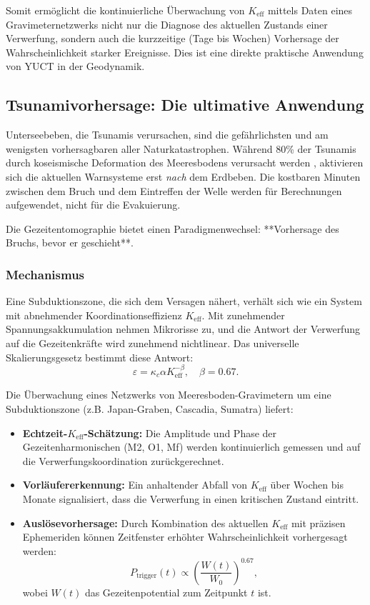 \documentclass[12pt,a4paper]{article}
\theoremstyle{remark}
\begin{document}
	Somit ermöglicht die kontinuierliche Überwachung von \(K_{\mathrm{eff}}\) mittels Daten eines Gravimeternetzwerks nicht nur die Diagnose des aktuellen Zustands einer Verwerfung, sondern auch die kurzzeitige (Tage bis Wochen) Vorhersage der Wahrscheinlichkeit starker Ereignisse. Dies ist eine direkte praktische Anwendung von YUCT in der Geodynamik.
	
	\subsection{Tsunamivorhersage: Die ultimative Anwendung}
	\label{sec:tsunami}
	
	Unterseebeben, die Tsunamis verursachen, sind die gefährlichsten und am wenigsten vorhersagbaren aller Naturkatastrophen. Während 80\% der Tsunamis durch koseismische Deformation des Meeresbodens verursacht werden \cite{NOAA2024, USGS2024}, aktivieren sich die aktuellen Warnsysteme erst \textit{nach} dem Erdbeben. Die kostbaren Minuten zwischen dem Bruch und dem Eintreffen der Welle werden für Berechnungen aufgewendet, nicht für die Evakuierung.
	
	Die Gezeitentomographie bietet einen Paradigmenwechsel: **Vorhersage des Bruchs, bevor er geschieht**.
	
	\subsubsection{Mechanismus}
	
	Eine Subduktionszone, die sich dem Versagen nähert, verhält sich wie ein System mit abnehmender Koordinationseffizienz \(K_{\mathrm{eff}}\). Mit zunehmender Spannungsakkumulation nehmen Mikrorisse zu, und die Antwort der Verwerfung auf die Gezeitenkräfte wird zunehmend nichtlinear. Das universelle Skalierungsgesetz bestimmt diese Antwort:
	\[
	\varepsilon = \kappa_c \alpha K_{\mathrm{eff}}^{-\beta}, \quad \beta = 0.67.
	\]
	
	Die Überwachung eines Netzwerks von Meeresboden-Gravimetern um eine Subduktionszone (z.B. Japan-Graben, Cascadia, Sumatra) liefert:
	\begin{itemize}
		\item \textbf{Echtzeit-\(K_{\mathrm{eff}}\)-Schätzung:} Die Amplitude und Phase der Gezeitenharmonischen (M2, O1, Mf) werden kontinuierlich gemessen und auf die Verwerfungskoordination zurückgerechnet.
		\item \textbf{Vorläufererkennung:} Ein anhaltender Abfall von \(K_{\mathrm{eff}}\) über Wochen bis Monate signalisiert, dass die Verwerfung in einen kritischen Zustand eintritt.
		\item \textbf{Auslösevorhersage:} Durch Kombination des aktuellen \(K_{\mathrm{eff}}\) mit präzisen Ephemeriden können Zeitfenster erhöhter Wahrscheinlichkeit vorhergesagt werden:
		\[
		P_{\text{trigger}}(t) \propto \left( \frac{W(t)}{W_0} \right)^{0.67},
		\]
		wobei \(W(t)\) das Gezeitenpotential zum Zeitpunkt \(t\) ist.
	\end{itemize}
	
\end{document}
